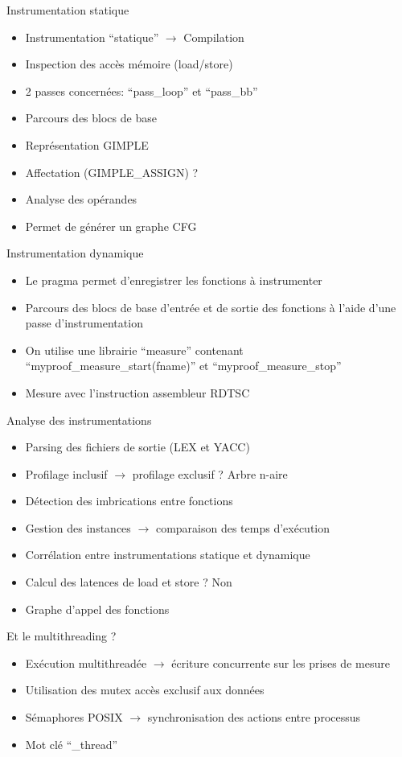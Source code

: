\documentclass{beamer}
\begin{document}
\begin{frame}{Instrumentation statique}
  \begin{itemize}
  \item Instrumentation ``statique'' $\rightarrow$ Compilation
  \item Inspection des accès mémoire (load/store)
  \item 2 passes concernées: ``pass\_loop'' et ``pass\_bb''
  \item Parcours des blocs de base
  \item Représentation GIMPLE
  \item Affectation (GIMPLE\_ASSIGN) ?
  \item Analyse des opérandes
  \item Permet de générer un graphe CFG
  \end{itemize}
\end{frame}

\begin{frame}{Instrumentation dynamique}
  \begin{itemize}
  \item Le pragma permet d'enregistrer les fonctions à instrumenter
  \item Parcours des blocs de base d'entrée et de sortie des fonctions à l'aide d'une passe d'instrumentation
  \item On utilise une librairie ``measure'' contenant ``myproof\_measure\_start(fname)'' et ``myproof\_measure\_stop''
  \item Mesure avec l'instruction assembleur RDTSC
  \end{itemize}
 \end{frame}
  

\begin{frame}{Analyse des instrumentations}
  \begin{itemize}
  \item Parsing des fichiers de sortie (LEX et YACC)
  \item Profilage inclusif $\rightarrow$ profilage exclusif ? Arbre n-aire
  \item Détection des imbrications entre fonctions
  \item Gestion des instances $\rightarrow$ comparaison des temps d'exécution
  \item Corrélation entre instrumentations statique et dynamique
  \item Calcul des latences de load et store ? Non
  \item Graphe d'appel des fonctions
  \end{itemize}
\end{frame}

\begin{frame}{Et le multithreading ?}
  \begin{itemize}
  \item Exécution multithreadée $\rightarrow$ écriture concurrente sur les prises de mesure
  \item Utilisation des mutex accès exclusif aux données
  \item Sémaphores POSIX $\rightarrow$ synchronisation des actions entre processus
  \item Mot clé ``\_thread''
  \end{itemize}
\end{frame}
\end{document}
